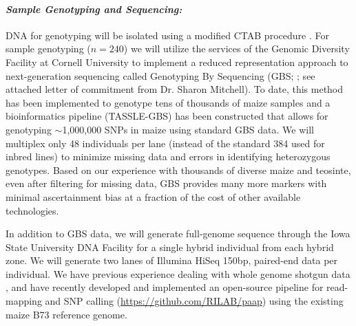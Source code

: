 \paragraph{\emph{Sample Genotyping and Sequencing:}}
DNA for genotyping will be isolated using a modified CTAB procedure \citep{Saghai-Maroof1984}.  For sample genotyping ($n=240$) we will utilize the services of the Genomic Diversity Facility at Cornell University to implement a reduced representation approach to next-generation sequencing called Genotyping By Sequencing (GBS; \citealt{Elshire2011}; see attached letter of commitment from Dr. Sharon Mitchell). To date, this method has been implemented to genotype tens of thousands of maize samples and a bioinformatics pipeline (TASSLE-GBS) has been constructed that allows for genotyping $\sim$1,000,000 SNPs in maize \citep{Glaubitz2014} using standard GBS data. 
We will multiplex only 48 individuals per lane (instead of the standard 384 used for inbred lines) to minimize missing data and errors in identifying heterozygous genotypes. 
Based on our experience with thousands of diverse maize and teosinte, even after filtering for missing data, GBS provides many more markers with minimal ascertainment bias at a fraction of the cost of other available technologies. 

In addition to GBS data, we will generate full-genome sequence through the Iowa State University DNA Facility for a single hybrid individual from each hybrid zone.  We will generate two lanes of Illumina HiSeq 150bp, paired-end data per individual.  
We have previous experience dealing with whole genome shotgun data \citep{Gore2009,Chia2012a,Hufford2012b}, and have recently developed and implemented an open-source pipeline for read-mapping and SNP calling (\url{https://github.com/RILAB/paap}) using the existing maize B73 reference genome. 

